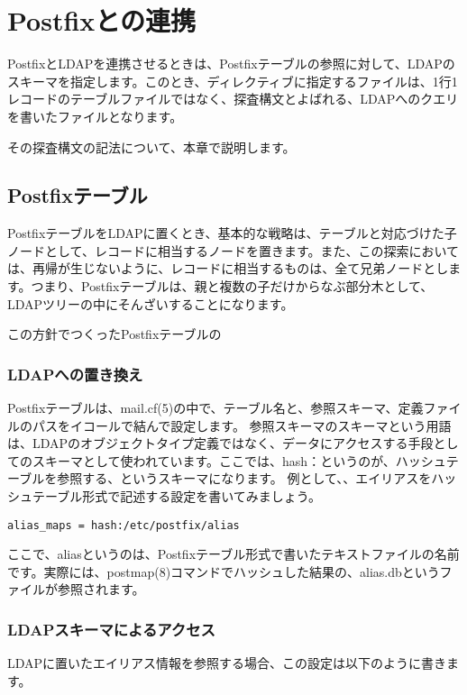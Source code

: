 \chapter{Postfixとの連携}

PostfixとLDAPを連携させるときは、Postfixテーブルの参照に対して、LDAPのスキーマを指定します。このとき、ディレクティブに指定するファイルは、1行1レコードのテーブルファイルではなく、探査構文とよばれる、LDAPへのクエリを書いたファイルとなります。

その探査構文の記法について、本章で説明します。

\section{Postfixテーブル}

PostfixテーブルをLDAPに置くとき、基本的な戦略は、テーブルと対応づけた子ノードとして、レコードに相当するノードを置きます。また、この探索においては、再帰が生じないように、レコードに相当するものは、全て兄弟ノードとします。つまり、Postfixテーブルは、親と複数の子だけからなぶ部分木として、LDAPツリーの中にそんざいすることになります。

この方針でつくったPostfixテーブルの

\subsection{LDAPへの置き換え}
Postfixテーブルは、mail.cf(5)の中で、テーブル名と、参照スキーマ、定義ファイルのパスをイコールで結んで設定します。
参照スキーマのスキーマという用語は、LDAPのオブジェクトタイプ定義ではなく、データにアクセスする手段としてのスキーマとして使われています。ここでは、hash：というのが、ハッシュテーブルを参照する、というスキーマになります。
例として、、エイリアスをハッシュテーブル形式で記述する設定を書いてみましょう。

\begin{verbatim}
alias_maps = hash:/etc/postfix/alias
\end{verbatim}

ここで、aliasというのは、Postfixテーブル形式で書いたテキストファイルの名前です。実際には、postmap(8)コマンドでハッシュした結果の、alias.dbというファイルが参照されます。

\subsection{LDAPスキーマによるアクセス}

LDAPに置いたエイリアス情報を参照する場合、この設定は以下のように書きます。

